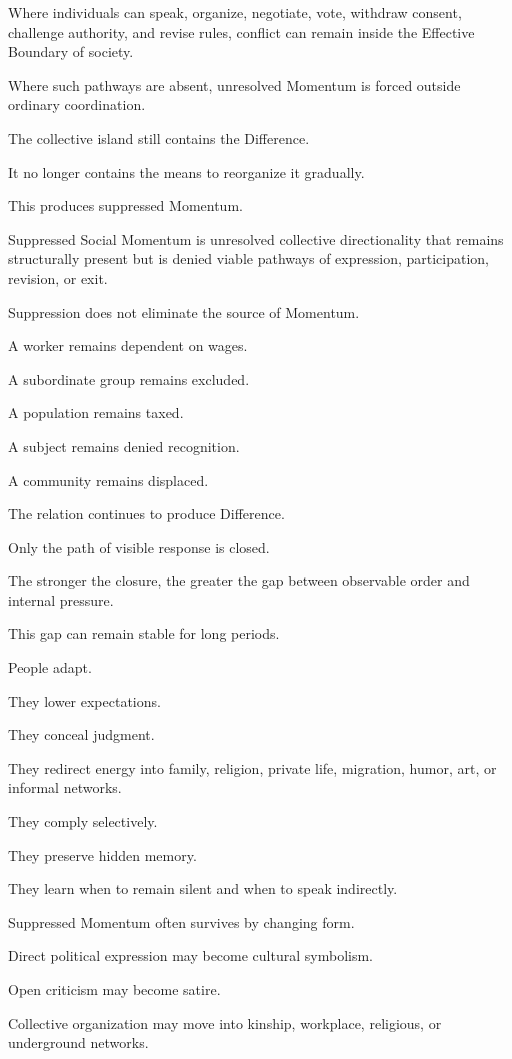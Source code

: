 Where individuals can speak, organize, negotiate, vote, withdraw consent, challenge authority, and revise rules, conflict can remain inside the Effective Boundary of society.

Where such pathways are absent, unresolved Momentum is forced outside ordinary coordination.

The collective island still contains the Difference.

It no longer contains the means to reorganize it gradually.

This produces suppressed Momentum.

Suppressed Social Momentum is unresolved collective directionality that remains structurally present but is denied viable pathways of expression, participation, revision, or exit.

Suppression does not eliminate the source of Momentum.

A worker remains dependent on wages.

A subordinate group remains excluded.

A population remains taxed.

A subject remains denied recognition.

A community remains displaced.

The relation continues to produce Difference.

Only the path of visible response is closed.

The stronger the closure, the greater the gap between observable order and internal pressure.

This gap can remain stable for long periods.

People adapt.

They lower expectations.

They conceal judgment.

They redirect energy into family, religion, private life, migration, humor, art, or informal networks.

They comply selectively.

They preserve hidden memory.

They learn when to remain silent and when to speak indirectly.

Suppressed Momentum often survives by changing form.

Direct political expression may become cultural symbolism.

Open criticism may become satire.

Collective organization may move into kinship, workplace, religious, or underground networks.

